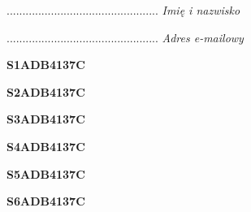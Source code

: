 \begin{turn}{90}\begin{minipage}{\linewidth} \vspace{20mm} ................................................  \textit{Imię i nazwisko}\end{minipage}\end{turn}

\begin{turn}{90}\begin{minipage}{\linewidth} \vspace{20mm} ................................................  \textit{Adres e-mailowy}\end{minipage}\end{turn}

\begin{turn}{90}\huge \begin{minipage}{\linewidth} \vspace{10mm}\textbf{S1ADB4137C}\end{minipage}\end{turn}

\begin{turn}{90}\huge \begin{minipage}{\linewidth} \vspace{10mm}\textbf{S2ADB4137C}\end{minipage}\end{turn}

\begin{turn}{90}\huge \begin{minipage}{\linewidth} \vspace{10mm}\textbf{S3ADB4137C}\end{minipage}\end{turn}

\begin{turn}{90}\huge \begin{minipage}{\linewidth} \vspace{10mm}\textbf{S4ADB4137C}\end{minipage}\end{turn}

\begin{turn}{90}\huge \begin{minipage}{\linewidth} \vspace{10mm}\textbf{S5ADB4137C}\end{minipage}\end{turn}

\begin{turn}{90}\huge \begin{minipage}{\linewidth} \vspace{10mm}\textbf{S6ADB4137C}\end{minipage}\end{turn}

